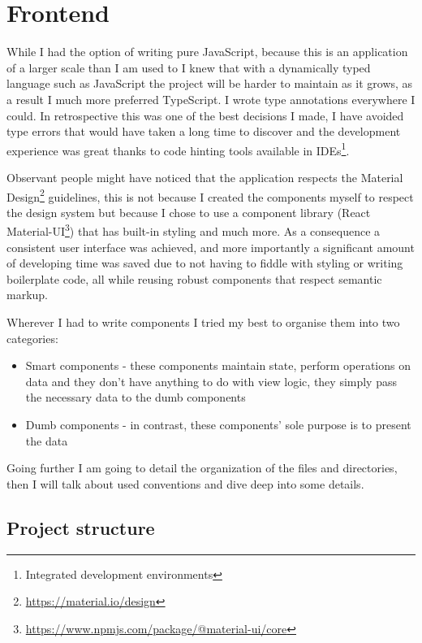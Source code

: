 \chapter{Frontend}

While I had the option of writing pure JavaScript, because this is an application of a larger scale than I am used to I knew that with a dynamically typed language such as JavaScript the project will be harder to maintain as it grows, as a result I much more preferred TypeScript. I wrote type annotations everywhere I could. In retrospective this was one of the best decisions I made, I have avoided type errors that would have taken a long time to discover and the development experience was great thanks to code hinting tools available in IDEs\footnote{Integrated development environments}.

Observant people might have noticed that the application respects the Material Design\footnote{\href{https://material.io/design}{https://material.io/design}} guidelines, this is not because I created the components myself to respect the design system but because I chose to use a component library (React Material-UI\footnote{\href{https://www.npmjs.com/package/@material-ui/core}{https://www.npmjs.com/package/@material-ui/core}}) that has built-in styling and much more. As a consequence a consistent user interface was achieved, and more importantly a significant amount of developing time was saved due to not having to fiddle with styling or writing boilerplate code, all while reusing robust components that respect semantic markup.

Wherever I had to write components I tried my best to organise them into two categories: 
\begin{itemize}
	\item Smart components - these components maintain state, perform operations on data and they don't have anything to do with view logic, they simply pass the necessary data to the dumb components
	\item Dumb components - in contrast, these components' sole purpose is to present the data
\end{itemize}

Going further I am going to detail the organization of the files and directories, then I will talk about used conventions and dive deep into some details.

\section{Project structure}

